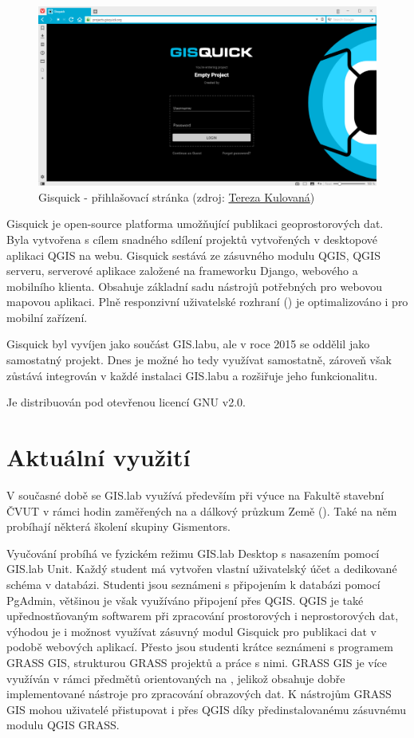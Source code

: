 \begin{figure}[H] \centering
    \includegraphics[width=400pt]{./pictures/gisquick-welcome-screen.png}
    \caption[Gisquick - přihlašovací stránka]{Gisquick - přihlašovací stránka (zdroj:
	\href{}{Tereza Kulovaná})}
    \label{fig:gisquick-welcome}
\end{figure}

Gisquick je open-source platforma umožňující publikaci geoprostorových
dat. Byla vytvořena s cílem snadného sdílení projektů vytvořených v
desktopové aplikaci QGIS na webu. Gisquick sestává ze zásuvného modulu
QGIS, QGIS serveru, serverové aplikace založené na frameworku Django,
webového a mobilního klienta. Obsahuje základní sadu nástrojů
potřebných pro webovou mapovou aplikaci. Plně responzivní uživatelské
rozhraní () je optimalizováno i pro mobilní zařízení.

Gisquick byl vyvíjen jako součást GIS.labu, ale v roce 2015 se oddělil
jako samostatný projekt. Dnes je možné ho tedy využívat samostatně,
zároveň však zůstává integrován v každé instalaci GIS.labu a rozšiřuje
jeho funkcionalitu.

Je distribuován pod otevřenou licencí GNU  v2.0.

\section{Aktuální využití}
\label{gislab-vyuziti}

V současné době se GIS.lab využívá především při výuce na Fakultě
stavební ČVUT v rámci hodin zaměřených na  a dálkový průzkum
Země (). Také na něm probíhají některá školení skupiny
Gismentors.

Vyučování probíhá ve fyzickém režimu GIS.lab Desktop s nasazením
pomocí GIS.lab Unit. Každý student má vytvořen vlastní uživatelský
účet a dedikované schéma v databázi. Studenti jsou seznámeni s
připojením k databázi pomocí PgAdmin, většinou je však využíváno
připojení přes QGIS. QGIS je také upřednostňovaným softwarem při
zpracování prostorových i neprostorových dat, výhodou je i možnost
využívat zásuvný modul Gisquick pro publikaci dat v podobě webových
aplikací. Přesto jsou studenti krátce seznámeni s programem GRASS GIS,
strukturou GRASS projektů a práce s nimi. GRASS GIS je více využíván v
rámci předmětů orientovaných na , jelikož obsahuje dobře
implementované nástroje pro zpracování obrazových dat. K nástrojům
GRASS GIS mohou uživatelé přistupovat i přes QGIS  díky
předinstalovanému zásuvnému modulu QGIS GRASS.

